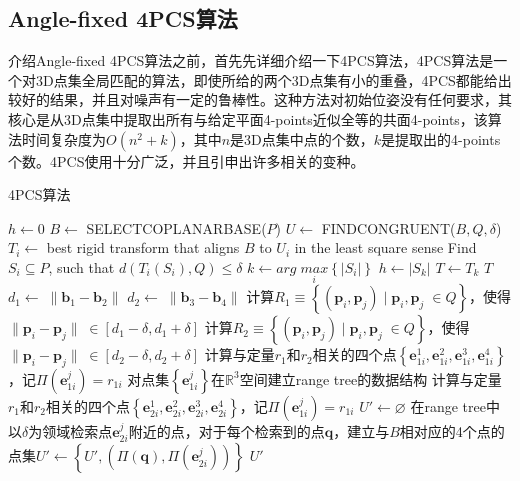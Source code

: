 \subsection{Angle-fixed 4PCS算法}
介绍Angle-fixed 4PCS算法之前，首先先详细介绍一下4PCS算法，4PCS算法是一个对3D点集全局匹配的算法，即使所给的两个3D点集有小的重叠，4PCS都能给出较好的结果，并且对噪声有一定的鲁棒性。这种方法对初始位姿没有任何要求，其核心是从3D点集中提取出所有与给定平面4-points近似全等的共面4-points，该算法时间复杂度为$O(n^2+k)$，其中$n$是3D点集中点的个数，$k$是提取出的4-points个数。4PCS使用十分广泛，并且引申出许多相关的变种\cite{corsini2013fully}。

\begin{algorithm}
  \caption{4PCS算法}
  \label{alg:4pcs}
  $h\leftarrow 0$\;
   {
    $B\leftarrow$ SELECTCOPLANARBASE($P$)\;
    $U\leftarrow$ FINDCONGRUENT($B,Q,\delta$)\;
     {
      $T_i\leftarrow$ best rigid transform that aligns $B$ to $U_i$ in the least square sense\;
      Find $S_i\subseteq P$, such that $d(T_i(S_i), Q)\leq\delta$\;
    }
    $k\leftarrow arg\;\underset{i}{max}\left\{|S_i|\right\}$\;
     {
      $h\leftarrow |S_k|$\;
      $T\leftarrow T_k$\;
    }
    \Return $T$\;
  }
  \BlankLine
  \BlankLine
  \BlankLine
  \BlankLine
   {
    $d_1\leftarrow\;\parallel\mathbf{b}_1-\mathbf{b}_2\parallel$\;
    $d_2\leftarrow\;\parallel\mathbf{b}_3-\mathbf{b}_4\parallel$\;
    计算$R_1\equiv\left\{(\mathbf{p}_i,\mathbf{p}_j)\;|\;\mathbf{p}_i,\mathbf{p}_j\;\in Q\right\}$，使得$\parallel\mathbf{p}_i-\mathbf{p}_j\parallel\;\in [d_1-\delta,d_1+\delta]$\;
    计算$R_2\equiv\left\{(\mathbf{p}_i,\mathbf{p}_j)\;|\;\mathbf{p}_i,\mathbf{p}_j\;\in Q\right\}$，使得$\parallel\mathbf{p}_i-\mathbf{p}_j\parallel\;\in [d_2-\delta,d_2+\delta]$\;
     {
      计算与定量$r_1$和$r_2$相关的四个点$\left\{\mathbf{e}_{1i}^1,\mathbf{e}_{1i}^2,\mathbf{e}_{1i}^3,\mathbf{e}_{1i}^4\right\}$，记$\Pi(\mathbf{e}_{1i}^j)=r_{1i}$\;
    }
    对点集$\left\{\mathbf{e}_{1i}^j\right\}$在$\mathbb{R}^3$空间建立range tree的数据结构\;
     {
      计算与定量$r_1$和$r_2$相关的四个点$\left\{\mathbf{e}_{2i}^1,\mathbf{e}_{2i}^2,\mathbf{e}_{2i}^3,\mathbf{e}_{2i}^4\right\}$，记$\Pi(\mathbf{e}_{1i}^j)=r_{1i}$\;
    }
    $U'\leftarrow\varnothing$\;
     {
      在range tree中以$\delta$为领域检索点$\mathbf{e}_{2i}^j$附近的点，对于每个检索到的点$\mathbf{q}$，建立与$B$相对应的4个点的点集$U'\leftarrow\left\{U',(\Pi(\mathbf{q}),\Pi(\mathbf{e}_{2i}^j))\right\}$\;
    }
    \Return $U'$\;
  }
\end{algorithm}

